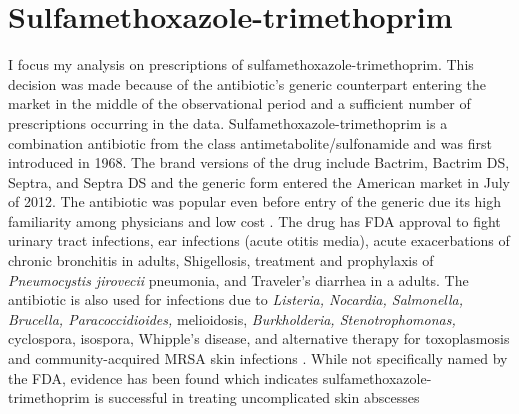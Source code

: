 \section{Sulfamethoxazole-trimethoprim}
\indent I focus my analysis on prescriptions of sulfamethoxazole-trimethoprim. This decision was made because of the antibiotic's generic counterpart entering the market in the middle of the observational period and a sufficient number of prescriptions occurring in the data. Sulfamethoxazole-trimethoprim is a combination antibiotic from the class antimetabolite/sulfonamide and was first introduced in 1968. The brand versions of the drug include Bactrim, Bactrim DS, Septra, and Septra DS and the generic form entered the American market in July of 2012. The antibiotic was popular even before entry of the generic due its high familiarity among physicians and low cost \cite{noauthor_sulfamethoxazole_nodate,ho_considerations_2011}. The drug has FDA approval to fight urinary tract infections, ear infections (acute otitis media), acute exacerbations of chronic bronchitis in adults, Shigellosis, treatment and prophylaxis of \textit{Pneumocystis jirovecii} pneumonia, and Traveler's diarrhea in a adults. The antibiotic is also used for infections due to \textit{Listeria, Nocardia, Salmonella, Brucella, Paracoccidioides,} melioidosis, \textit{Burkholderia, Stenotrophomonas,} cyclospora, isospora, Whipple's disease, and alternative therapy for toxoplasmosis and community-acquired MRSA skin infections \cite{schlossberg_antibiotics_2017}. While not specifically named by the FDA, evidence has been found which indicates sulfamethoxazole-trimethoprim is successful in treating uncomplicated skin abscesses \cite{noauthor_trimethoprimsulfamethoxazole_nodate}\\
